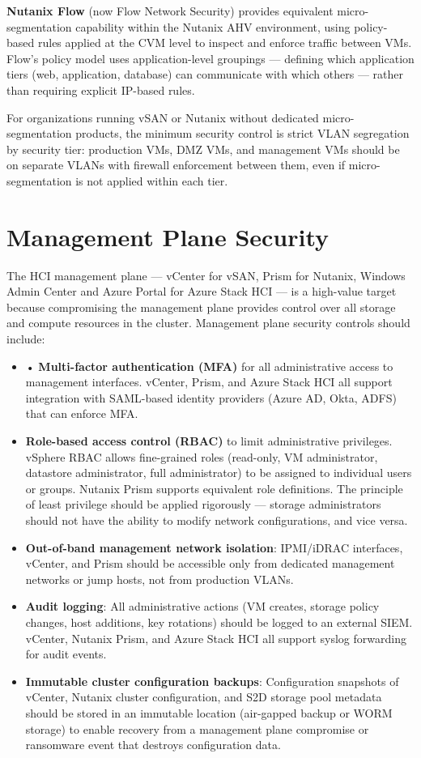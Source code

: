 \textbf{Nutanix Flow} (now Flow Network Security) provides equivalent micro-segmentation capability within the Nutanix AHV environment, using policy-based rules applied at the CVM level to inspect and enforce traffic between VMs. Flow's policy model uses application-level groupings --- defining which application tiers (web, application, database) can communicate with which others --- rather than requiring explicit IP-based rules.

For organizations running vSAN or Nutanix without dedicated micro-segmentation products, the minimum security control is strict VLAN segregation by security tier: production VMs, DMZ VMs, and management VMs should be on separate VLANs with firewall enforcement between them, even if micro-segmentation is not applied within each tier.

\section{Management Plane Security}
The HCI management plane --- vCenter for vSAN, Prism for Nutanix, Windows Admin Center and Azure Portal for Azure Stack HCI --- is a high-value target because compromising the management plane provides control over all storage and compute resources in the cluster. Management plane security controls should include:

\begin{itemize}
  \item • \textbf{Multi-factor authentication (MFA)} for all administrative access to management interfaces. vCenter, Prism, and Azure Stack HCI all support integration with SAML-based identity providers (Azure AD, Okta, ADFS) that can enforce MFA.
  \item \textbf{Role-based access control (RBAC)} to limit administrative privileges. vSphere RBAC allows fine-grained roles (read-only, VM administrator, datastore administrator, full administrator) to be assigned to individual users or groups. Nutanix Prism supports equivalent role definitions. The principle of least privilege should be applied rigorously --- storage administrators should not have the ability to modify network configurations, and vice versa.
  \item \textbf{Out-of-band management network isolation}: IPMI/iDRAC interfaces, vCenter, and Prism should be accessible only from dedicated management networks or jump hosts, not from production VLANs.
  \item \textbf{Audit logging}: All administrative actions (VM creates, storage policy changes, host additions, key rotations) should be logged to an external SIEM. vCenter, Nutanix Prism, and Azure Stack HCI all support syslog forwarding for audit events.
  \item \textbf{Immutable cluster configuration backups}: Configuration snapshots of vCenter, Nutanix cluster configuration, and S2D storage pool metadata should be stored in an immutable location (air-gapped backup or WORM storage) to enable recovery from a management plane compromise or ransomware event that destroys configuration data.
\end{itemize}

